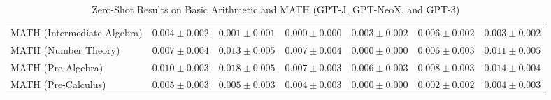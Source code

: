 \documentclass[11pt]{article}
\begin{document}
{\begin{landscape}
\begin{table}
\begin{tabular}{l c c c c c c }
MATH (Intermediate Algebra) & $0.004 \pm 0.002$ & $0.001 \pm 0.001$ & $0.000 \pm 0.000$ & $0.003 \pm 0.002$ & $0.006 \pm 0.002$ & $0.003 \pm 0.002$ \\ 
MATH (Number Theory) & $0.007 \pm 0.004$ & $0.013 \pm 0.005$ & $0.007 \pm 0.004$ & $0.000 \pm 0.000$ & $0.006 \pm 0.003$ & $0.011 \pm 0.005$ \\ 
MATH (Pre-Algebra) & $0.010 \pm 0.003$ & $0.018 \pm 0.005$ & $0.007 \pm 0.003$ & $0.006 \pm 0.003$ & $0.008 \pm 0.003$ & $0.014 \pm 0.004$ \\ 
MATH (Pre-Calculus) & $0.005 \pm 0.003$ & $0.005 \pm 0.003$ & $0.004 \pm 0.003$ & $0.000 \pm 0.000$ & $0.002 \pm 0.002$ & $0.004 \pm 0.003$ \\ 

\bottomrule 
\end{tabular}
\caption{Zero-Shot Results on Basic Arithmetic and MATH (GPT-J, GPT-NeoX, and GPT-3)}\label{tab:math_gpt}
\end{table}


\end{landscape}}
\end{document}

